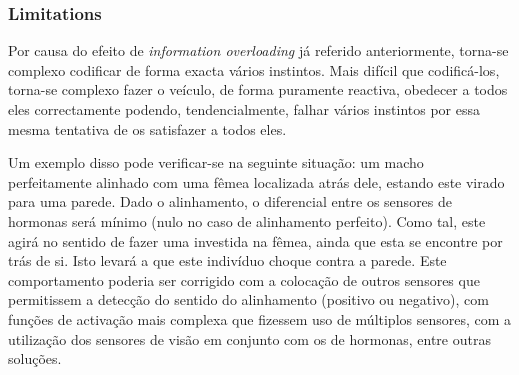 \documentclass[a4paper]{article}
\begin{document}
\subsubsection{Limitations}
\indent \indent Por causa do efeito de \emph{information overloading} já referido anteriormente, torna-se complexo codificar de forma exacta vários instintos. Mais difícil que codificá-los, torna-se complexo fazer o veículo, de forma puramente reactiva, obedecer a todos eles correctamente podendo, tendencialmente, falhar vários instintos por essa mesma tentativa de os satisfazer a todos eles.

Um exemplo disso pode verificar-se na seguinte situação: um macho perfeitamente alinhado com uma fêmea localizada atrás dele, estando este virado para uma parede. Dado o alinhamento, o diferencial entre os sensores de hormonas será mínimo (nulo no caso de alinhamento perfeito). Como tal, este agirá no sentido de fazer uma investida na fêmea, ainda que esta se encontre por trás de si. Isto levará a que este indivíduo choque contra a parede. Este comportamento poderia ser corrigido com a colocação de outros sensores que permitissem a detecção do sentido do alinhamento (positivo ou negativo), com funções de activação mais complexa que fizessem uso de múltiplos sensores, com a utilização dos sensores de visão em conjunto com os de hormonas, entre outras soluções.
\end{document}
